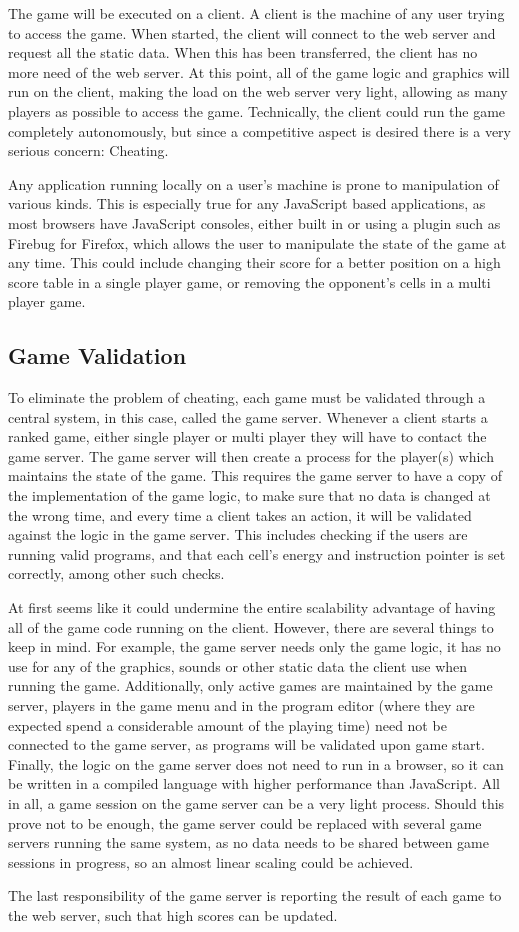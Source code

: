 The game will be executed on a client. A client is the machine of any user trying to access the game. When started, the client will connect to the web server and request all the static data. When this has been transferred, the client has no more need of the web server. At this point, all of the game logic and graphics will run on the client, making the load on the web server very light, allowing as many players as possible to access the game. Technically, the client could run the game completely autonomously, but since a competitive aspect is desired there is a very serious concern: Cheating.

Any application running locally on a user's machine is prone to manipulation of various kinds. This is especially true for any JavaScript based applications, as most browsers have JavaScript consoles, either built in or using a plugin such as Firebug for Firefox, which allows the user to manipulate the state of the game at any time. This could include changing their score for a better position on a high score table in a single player game, or removing the opponent's cells in a multi player game.

\subsection{Game Validation}

To eliminate the problem of cheating, each game must be validated through a central system, in this case, called the game server. Whenever a client starts a ranked game, either single player or multi player they will have to contact the game server. The game server will then create a process for the player(s) which maintains the state of the game. This requires the game server to have a copy of the implementation of the game logic, to make sure that no data is changed at the wrong time, and every time a client takes an action, it will be validated against the logic in the game server. This includes checking if the users are running valid programs, and that each cell's energy and instruction pointer is set correctly, among other such checks.

At first seems like it could undermine the entire scalability advantage of having all of the game code running on the client. However, there are several things to keep in mind. For example, the game server needs only the game logic, it has no use for any of the graphics, sounds or other static data the client use when running the game. Additionally, only active games are maintained by the game server, players in the game menu and in the program editor (where they are expected spend a considerable amount of the playing time) need not be connected to the game server, as programs will be validated upon game start. Finally, the logic on the game server does not need to run in a browser, so it can be written in a compiled language with higher performance than JavaScript. All in all, a game session on the game server can be a very light process. Should this prove not to be enough, the game server could be replaced with several game servers running the same system, as no data needs to be shared between game sessions in progress, so an almost linear scaling could be achieved.

The last responsibility of the game server is reporting the result of each game to the web server, such that high scores can be updated.

